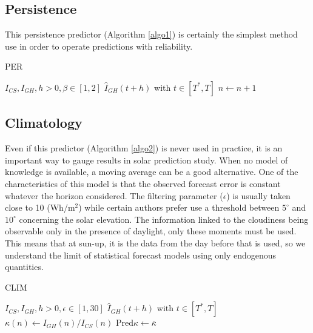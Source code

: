 \documentclass[preprint,12pt,3p]{elsarticle}
\begin{document}
 
\subsection{Persistence}
\label{algo:Pers}
This persistence predictor (Algorithm \ref{algo1}) is certainly the simplest method use in order to operate predictions with reliability. 

\begin{algorithm}
\caption{PER}
\begin{algorithmic} 
\label{algo1}
\REQUIRE $ I_{CS}, I_{GH},h>0, \beta \in [1,2] $
\ENSURE $\widehat{I}_{GH}(t+h)$ with $t \in [T^*,T]$
\REPEAT 
\STATE $n\leftarrow n+1$
\end{algorithmic}
\end{algorithm}

\subsection{Climatology}
\label{algo:Clim}
Even if this predictor (Algorithm \ref{algo2}) is never used in practice, it is an important way to gauge results in solar prediction study. When no model of knowledge is available, a moving average can be a good alternative. One of the characteristics of this model is that the observed forecast error is constant whatever the horizon considered. The filtering parameter ($\epsilon$) is usually taken close to 10 (Wh/m$^2$) while certain authors prefer use a threshold between $5^\circ$ and $10^\circ$ concerning the solar elevation. The information linked to the cloudiness being observable only in the presence of daylight, only these moments must be used. This means that at sun-up, it is the data from the day before that is used, so we understand the limit of statistical forecast models using only endogenous quantities.

\begin{algorithm}
\caption{CLIM}
\begin{algorithmic} 
\label{algo2}
\REQUIRE $ I_{CS},I_{GH},h>0,\epsilon \in [1,30]  $
\ENSURE $\widehat{I}_{GH}(t+h)$ with $t \in [T^*,T]$
\ELSE
\STATE $\kappa(n) \leftarrow I_{GH}(n)/I_{CS}(n)$
\ENDIF
\ENDFOR
{}
\STATE Pred$\kappa \leftarrow \bar{\kappa}$
\end{algorithmic}
\end{algorithm}
 
\end{document}
